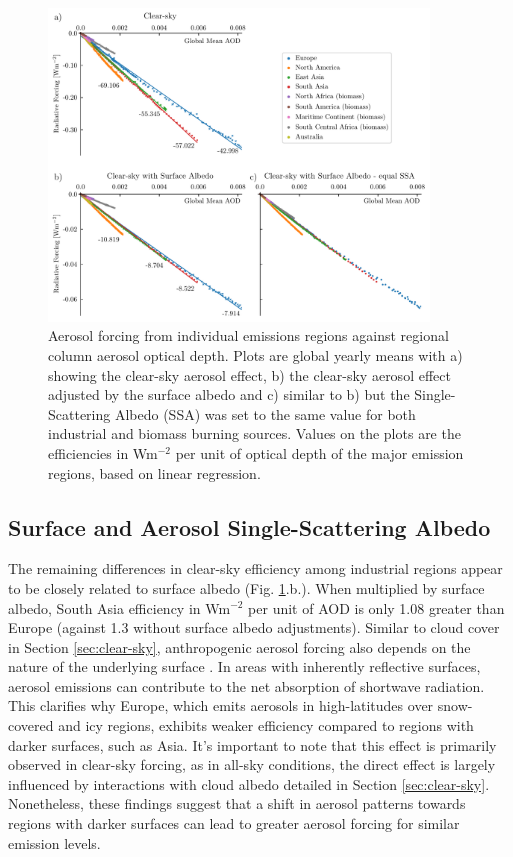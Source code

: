 \documentclass[draft]{agujournal2019}
\begin{document}
      \begin{figure}
            \centering
            \includegraphics[width=0.9\textwidth]{../../figures/figure4}
            \caption{Aerosol forcing from individual emissions regions against regional column aerosol optical depth. Plots are global yearly means with a) showing the clear-sky aerosol effect, b) the clear-sky aerosol effect adjusted by the surface albedo and c) similar to b) but the Single-Scattering Albedo (SSA) was set to the same value for both industrial and biomass burning sources. Values on the plots are the efficiencies in Wm$^{-2}$ per unit of optical depth of the major emission regions, based on linear regression.}
            \label{fig:figure4}
      \end{figure}

      \subsection{Surface and Aerosol Single-Scattering Albedo}

            The remaining differences in clear-sky efficiency among industrial regions appear to be closely related to surface albedo (Fig. \ref{fig:figure4}.b.). When multiplied by surface albedo, South Asia efficiency in Wm$^{-2}$ per unit of AOD is only 1.08 greater than Europe (against 1.3 without surface albedo adjustments). Similar to cloud cover in Section \ref{sec:clear-sky}, anthropogenic aerosol forcing also depends on the nature of the underlying surface \cite{Li_2022}. In areas with inherently reflective surfaces, aerosol emissions can contribute to the net absorption of shortwave radiation. This clarifies why Europe, which emits aerosols in high-latitudes over snow-covered and icy regions, exhibits weaker efficiency compared to regions with darker surfaces, such as Asia. It's important to note that this effect is primarily observed in clear-sky forcing, as in all-sky conditions, the direct effect is largely influenced by interactions with cloud albedo detailed in Section \ref{sec:clear-sky}. Nonetheless, these findings suggest that a shift in aerosol patterns towards regions with darker surfaces can lead to greater aerosol forcing for similar emission levels.
            
\end{document}
